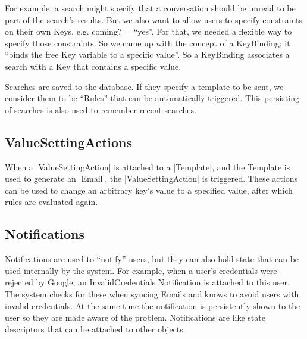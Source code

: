 For example, a search might specify that a conversation should be unread to be part of the search’s results. But we also want to allow users to specify constraints on their own Keys, e.g. coming? = ``yes''. For that, we needed a flexible way to specify those constraints. So we came up with the concept of a KeyBinding; it ``binds the free Key variable to a specific value''. So a KeyBinding associates a search with a Key that contains a specific value.

Searches are saved to the database. If they specify a template to be sent, we consider them to be ``Rules'' that can be automatically triggered. This persisting of searches is also used to remember recent searches.

\subsection{ValueSettingActions}

When a |ValueSettingAction| is attached to a |Template|, and the Template is used to generate an |Email|, the |ValueSettingAction| is triggered. These actions can be used to change an arbitrary key's value to a specified value, after which rules are evaluated again.


\subsection{Notifications}

Notifications are used to ``notify'' users, but they can also hold state that can be used internally by the system. For example, when a user's credentials were rejected by Google, an InvalidCredentials Notification is attached to this user. The system checks for these when syncing Emails and knows to avoid users with invalid credentials. At the same time the notification is persistently shown to the user so they are made aware of the problem. Notifications are like state descriptors that can be attached to other objects.

